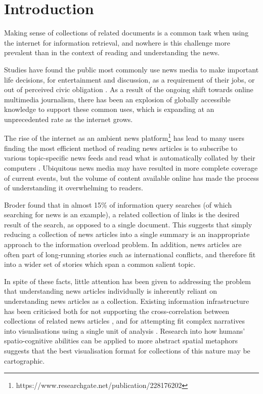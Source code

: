 
\section{Introduction}

Making sense of collections of related documents is a common task when using the internet for information retrieval, and nowhere is this challenge more prevalent than in the context of reading and understanding the news.

Studies have found the public most commonly use news media to make important life decisions, for entertainment and discussion, as a requirement of their jobs, or out of perceived civic obligation \citep{InformationCartography, UnderstandingTheParticipatoryNewsConsumer}. As a result of the ongoing shift towards online multimedia journalism, 
there has been an explosion of globally accessible knowledge to support these common uses, which is expanding at an unprecedented rate as the internet grows.

The rise of the internet as an ambient news platform\footnote{https://www.researchgate.net/publication/228176202} has lead to many users finding the most efficient method of reading news articles is to subscribe to various topic-specific news feeds and read what is automatically collated by their computers \citep{nReader}. Ubiquitous news media may have resulted in more complete coverage of current events, but the volume of content available online has made the process of understanding it overwhelming to readers.

Broder\citep{ATaxonomyofWebSearch} found that in almost 15\% of information query searches (of which searching for news is an example), a related collection of links is the desired result of the search, as opposed to a single document. This suggests that simply reducing a collection of news articles into a single summary is an inappropriate approach to the information overload problem. In addition, news articles are often part of long-running stories \citep{ExploringLongRunningNewsStoriesUsingWikipedia} such as international conflicts, and therefore fit into a wider set of stories which span a common salient topic.

In spite of these facts, little attention has been given to addressing the problem that understanding news articles individually is inherently reliant on understanding news articles as a collection. Existing information infrastructure has been criticised both for not supporting the cross-correlation between collections of related news articles \citep{GalaxyOfNews}, and for attempting fit complex narratives into visualisations using a single unit of analysis \citep{InformationCartography}. Research into how humans' spatio-cognitive abilities can be applied to more abstract spatial metaphors \citep{FromMetaphorToMethod} suggests that the best visualisation format for collections of this nature may be cartographic.

